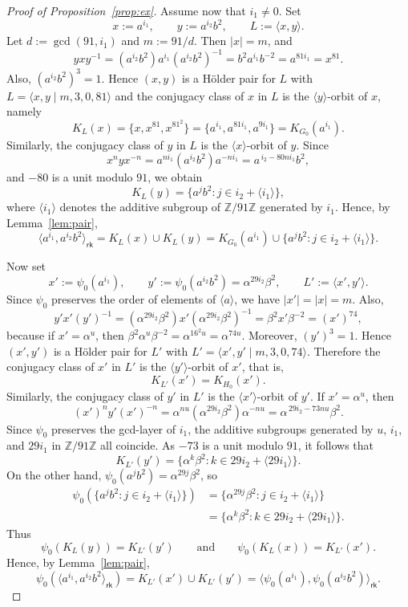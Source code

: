 \documentclass[a4paper,12pt]{article}
\theoremstyle{definition}
\theoremstyle{remark}
\begin{document}
\begin{proof}[Proof of Proposition~\ref{prop:ex}]
  Assume now that $i_1\neq 0$. Set
  $$ x:=a^{i_1},\qquad y:=a^{i_2}b^2,\qquad L:=\langle x,y\rangle. $$
  Let $d:=\gcd(91,i_1)$ and $m:=91/d$. Then $|x|=m$, and
  $$ yxy^{-1} = (a^{i_2}b^2)a^{i_1}(a^{i_2}b^2)^{-1} = b^2a^{i_1}b^{-2} = a^{81i_1} = x^{81}. $$
  Also, $(a^{i_2}b^2)^3=1$. Hence $(x,y)$ is a Hölder pair for $L$ with $L=\langle x,y\mid m,3,0,81\rangle$ and the conjugacy class of $x$ in $L$ is the $\langle y\rangle$-orbit of $x$, namely
  $$ K_L(x)=\{x,x^{81},x^{81^2}\}=\{a^{i_1},a^{81i_1},a^{9i_1}\}=K_{G_0}(a^{i_1}). $$
  Similarly, the conjugacy class of $y$ in $L$ is the $\langle x\rangle$-orbit of $y$. Since
  $$ x^n y x^{-n} = a^{ni_1}(a^{i_2}b^2)a^{-ni_1} = a^{\,i_2-80ni_1}b^2, $$
  and $-80$ is a unit modulo $91$, we obtain
  $$ K_L(y)=\{a^j b^2 : j\in i_2+\langle i_1\rangle\}, $$
  where $\langle i_1\rangle$ denotes the additive subgroup of $\mathbb{Z}/91\mathbb{Z}$ generated by $i_1$. Hence, by Lemma~\ref{lem:pair},
  $$ \langle a^{i_1},a^{i_2}b^2\rangle_{\mathsf{rk}} = K_L(x)\cup K_L(y) = K_{G_0}(a^{i_1})\cup \{a^j b^2 : j\in i_2+\langle i_1\rangle\}. $$
  
  Now set
  $$ x':=\psi_0(a^{i_1}),\qquad y':=\psi_0(a^{i_2}b^2)=\alpha^{29i_2}\beta^2,\qquad L':=\langle x',y'\rangle. $$
  Since $\psi_0$ preserves the order of elements of $\langle a\rangle$, we have $|x'|=|x|=m$. Also,
  $$ y'x'(y')^{-1} = (\alpha^{29i_2}\beta^2)x'(\alpha^{29i_2}\beta^2)^{-1} = \beta^2x'\beta^{-2} = (x')^{74}, $$
  because if $x'=\alpha^u$, then $\beta^2\alpha^u\beta^{-2}=\alpha^{16^2u}=\alpha^{74u}$. Moreover, $(y')^3=1$. Hence $(x',y')$ is a Hölder pair for $L'$ with $L' = \langle x',y'\mid m,3,0,74\rangle$. Therefore the conjugacy class of $x'$ in $L'$ is the $\langle y'\rangle$-orbit of $x'$,
  that is,
  $$ K_{L'}(x')=K_{H_0}(x'). $$
  Similarly, the conjugacy class of $y'$ in $L'$ is the $\langle x'\rangle$-orbit of $y'$. If
  $x'=\alpha^u$, then
  $$ (x')^n y' (x')^{-n} = \alpha^{nu}(\alpha^{29i_2}\beta^2)\alpha^{-nu} = \alpha^{\,29i_2-73nu}\beta^2. $$
  Since $\psi_0$ preserves the gcd-layer of $i_1$, the additive subgroups generated by $u$, $i_1$, and $29i_1$ in $\mathbb{Z}/91\mathbb{Z}$ all coincide. As $-73$ is a unit modulo
  $91$, it follows that
  $$ K_{L'}(y')=\{\alpha^k\beta^2 : k\in 29i_2+\langle 29i_1\rangle\}. $$
  On the other hand, $\psi_0(a^j b^2)=\alpha^{29j}\beta^2$, so
  \begin{align*}
    \psi_0(\{a^j b^2:j\in i_2+\langle i_1\rangle\})
    &= \{\alpha^{29j}\beta^2:j\in i_2+\langle i_1\rangle\} \\
    &= \{\alpha^k\beta^2:k\in 29i_2+\langle 29i_1\rangle\}.
  \end{align*}
  Thus
  $$ \psi_0(K_L(y))=K_{L'}(y') \qquad\text{and}\qquad \psi_0(K_L(x))=K_{L'}(x'). $$
  Hence, by Lemma~\ref{lem:pair},
  $$ \psi_0(\langle a^{i_1},a^{i_2}b^2\rangle_{\mathsf{rk}}) = K_{L'}(x')\cup K_{L'}(y') = \langle \psi_0(a^{i_1}),\psi_0(a^{i_2}b^2)\rangle_{\mathsf{rk}}. $$
  

\end{proof}
\end{document}
